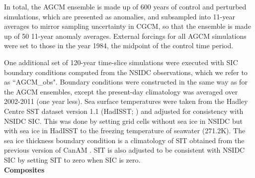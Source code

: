 \documentclass{nature}
\begin{document}
\begin{methods}

In total, the AGCM ensemble is made up of 600 years of control and perturbed simulations, which are presented as anomalies, and subsampled into 11-year averages to mirror sampling uncertainty in CGCM, so that the ensemble is made up of 50 11-year anomaly averages. External forcings for all AGCM simulations were set to those in the year 1984, the midpoint of the control time period.  %

One additional set of 120-year time-slice simulations were executed with SIC boundary conditions computed from the NSIDC observations, which we refer to as ``AGCM\_obs". Boundary conditions were constructed in the same way as for the AGCM ensembles, except the present-day climatology was averaged over 2002-2011 (one year less). Sea surface temperatures were taken from the Hadley Centre SST dataset version 1.1 (HadISST; \cite{rayner03}) and adjusted for consistency with NSIDC SIC. This was done by setting grid cells without sea ice in NSIDC but with sea ice in HadISST to the freezing temperature of seawater (271.2K). The sea ice thickness boundary condition is a climatology of SIT obtained from the previous version of CanAM \cite{merryfield13}. SIT is also adjusted to be consistent with NSIDC SIC by setting SIT to zero when SIC is zero.
\\
\textbf{Composites}\\

\end{methods}
\end{document}
